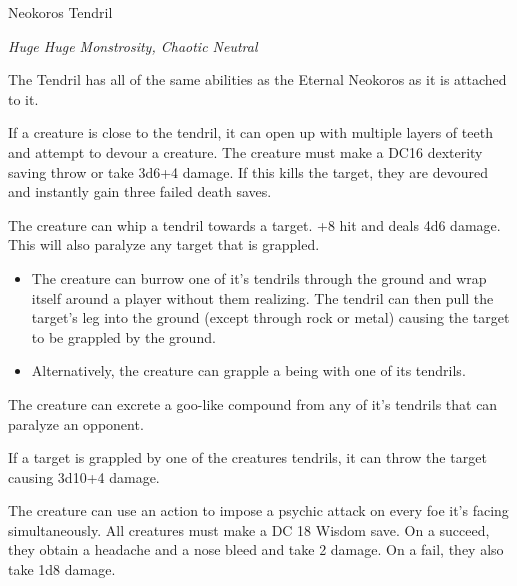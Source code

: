 \begin{monsterbox}{Neokoros Tendril}
	\begin{hangingpar}
		\textit{Huge Huge Monstrosity, Chaotic Neutral}
	\end{hangingpar}
	\dndline%
	\basics[%
	armorclass = 21 (Body) + 23 (tendrils),
	hitpoints  = 180,
	speed      = 5 ft (self) + 40 ft (tendrils)
	]
	\dndline%
	\stats[
	STR = \stat{21}, %
	DEX = \stat{18},
	CON = \stat{30},
	INT = \stat{30},
	WIS = \stat{24},
	CHA = \stat{16}
	]
	\dndline%
	\begin{monsteraction}
		The Tendril has all of the same abilities as the Eternal Neokoros as it is attached to it.
	\end{monsteraction}	
	
	\begin{monsteraction}
		If a creature is close to the tendril, it can open up with multiple layers of teeth and attempt to devour a creature. The creature must make a DC16 dexterity saving throw or take 3d6+4 damage. If this kills the target, they are devoured and instantly gain three failed death saves.
	\end{monsteraction}
	\begin{monsteraction}
		The creature can whip a tendril towards a target. +8 hit and deals 4d6 damage. This will also paralyze any target that is grappled.
	\end{monsteraction}
	\begin{monsteraction}
		\begin{itemize}
			\item The creature can burrow one of it's tendrils through the ground and wrap itself around a player without them realizing. The tendril can then pull the target's leg into the ground (except through rock or metal) causing the target to be grappled by the ground.
			\item Alternatively, the creature can grapple a being with one of its tendrils.
		\end{itemize}
	\end{monsteraction}
	\begin{monsteraction}
		The creature can excrete a goo-like compound from any of it's tendrils that can paralyze an opponent. 
	\end{monsteraction}
	\begin{monsteraction}
		If a target is grappled by one of the creatures tendrils, it can throw the target causing 3d10+4 damage.
	\end{monsteraction}
	\begin{monsteraction}
		The creature can use an action to impose a psychic attack on every foe it's facing simultaneously. All creatures must make a DC 18 Wisdom save. On a succeed, they obtain a headache and a nose bleed and take 2 damage. On a fail, they also take 1d8 damage.
	\end{monsteraction}
	

\end{monsterbox}
